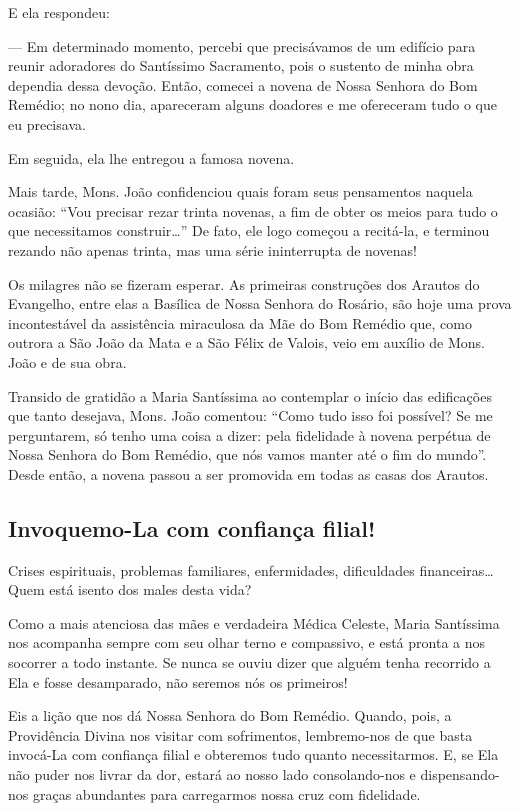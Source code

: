 \documentclass[a4paper,14pt]{extarticle} \usepackage[utf8]{inputenc}
\begin{document}
E ela respondeu:

— Em determinado momento, percebi que precisávamos de um edifício para reunir adoradores do Santíssimo Sacramento, pois o sustento de minha obra dependia dessa devoção. Então, comecei a novena de Nossa Senhora do Bom Remédio; no nono dia, apareceram alguns doadores e me ofereceram tudo o que eu precisava.

Em seguida, ela lhe entregou a famosa novena.

Mais tarde, Mons. João confidenciou quais foram seus pensamentos naquela ocasião: “Vou precisar rezar trinta novenas, a fim de obter os meios para tudo o que necessitamos construir…” De fato, ele logo começou a recitá-la, e terminou rezando não apenas trinta, mas uma série ininterrupta de novenas!

Os milagres não se fizeram esperar. As primeiras construções dos Arautos do Evangelho, entre elas a Basílica de Nossa Senhora do Rosário, são hoje uma prova incontestável da assistência miraculosa da Mãe do Bom Remédio que, como outrora a São João da Mata e a São Félix de Valois, veio em auxílio de Mons. João e de sua obra.

Transido de gratidão a Maria Santíssima ao contemplar o início das edificações que tanto desejava, Mons. João comentou: “Como tudo isso foi possível? Se me perguntarem, só tenho uma coisa a dizer: pela fidelidade à novena perpétua de Nossa Senhora do Bom Remédio, que nós vamos manter até o fim do mundo”. Desde então, a novena passou a ser promovida em todas as casas dos Arautos.

\subsection{Invoquemo-La com confiança filial!}

Crises espirituais, problemas familiares, enfermidades, dificuldades financeiras… Quem está isento dos males desta vida?

Como a mais atenciosa das mães e verdadeira Médica Celeste, Maria Santíssima nos acompanha sempre com seu olhar terno e compassivo, e está pronta a nos socorrer a todo instante. Se nunca se ouviu dizer que alguém tenha recorrido a Ela e fosse desamparado, não seremos nós os primeiros!

Eis a lição que nos dá Nossa Senhora do Bom Remédio. Quando, pois, a Providência Divina nos visitar com sofrimentos, lembremo-nos de que basta invocá-La com confiança filial e obteremos tudo quanto necessitarmos. E, se Ela não puder nos livrar da dor, estará ao nosso lado consolando-nos e dispensando-nos graças abundantes para carregarmos nossa cruz com fidelidade.
\end{document}
